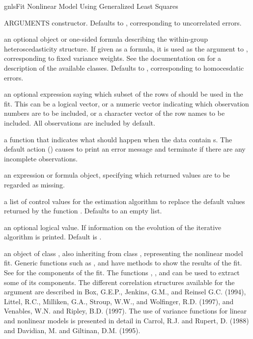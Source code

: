 \documentclass[pdftex]{article} \usepackage{url,graphicx}
\begin{document}
\begin{Helpfile}{gnls}{Fit Nonlinear Model Using Generalized Least Squares}
\begin{Argument}{ARGUMENTS}
constructor. Defaults to , corresponding to uncorrelated
errors.
\item[\Co{weights:}]
an optional  object or one-sided formula
describing the within-group heteroscedasticity structure. If given as
a formula, it is used as the argument to ,
corresponding to fixed variance weights. See the documentation on
 for a description of the available 
classes. Defaults to , corresponding to homocesdatic
errors.
\item[\Co{subset:}]
an optional expression saying which subset of the rows of
 should  be  used in the fit. This can be a logical
vector, or a numeric vector indicating which observation numbers are
to be included, or a  character  vector of the row names to be
included.  All observations are included by default.
\item[\Co{na.action:}]
a function that indicates what should happen when the
data contain s.  The default action () causes
 to print an error message and terminate if there are any
incomplete observations.
\item[\Co{naPattern:}]
an expression or formula object, specifying which returned
values are to be regarded as missing.
\item[\Co{control:}]
a list of control values for the estimation algorithm to
replace the default values returned by the function .
Defaults to an empty list.
\item[\Co{verbose:}]
an optional logical value. If  information on
the evolution of the iterative algorithm is printed. Default is
.
\end{Argument}
an object of class , also inheriting from class ,
representing the nonlinear model fit. Generic functions such as
,  and   have methods to show the
results of the fit. See  for the components of the
fit. The functions , , and  can be
used to extract some of its components.
The different correlation structures available for the
 argument are described in Box, G.E.P., Jenkins,
G.M., and Reinsel G.C. (1994), Littel, R.C., Milliken, G.A., Stroup,
W.W., and Wolfinger, R.D. (1997), and Venables, W.N. and Ripley,
B.D. (1997). The use of variance functions for linear 
and nonlinear models is presented in detail in Carrol, R.J. and Rupert,
D. (1988) and Davidian, M. and Giltinan, D.M. (1995).  \\

\end{Helpfile}
\end{document}
